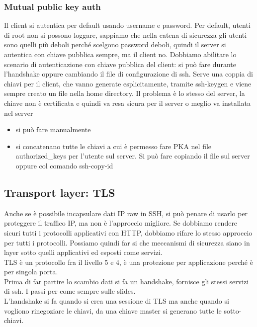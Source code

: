 \documentclass[12pt, oneside]{extbook} %
\begin{document}
\subsubsection{Mutual public key auth}
Il client si autentica per default usando username e password. Per default, utenti di root non si possono loggare, sappiamo che nella catena di sicurezza gli utenti sono quelli più deboli perché scelgono password deboli, quindi il server si autentica con chiave pubblica sempre, ma il client no. Dobbiamo abilitare lo scenario di autenticazione con chiave pubblica del client: si può fare durante l'handshake oppure cambiando il file di configurazione di ssh. Serve una coppia di chiavi per il client, che vanno generate esplicitamente, tramite \textsf{ssh-keygen} e viene sempre creato un file nella home directory. Il problema è lo stesso del server, la chiave non è certificata e quindi va resa sicura per il server o meglio va installata nel server
\begin{itemize}
\item si può fare manualmente
\item si concatenano tutte le chiavi a cui è permesso fare PKA nel file \textsf{authorized\_keys} per l'utente sul server. Si può fare copiando il file sul server oppure col comando \textsf{ssh-copy-id}
\end{itemize}
\subsection{Transport layer: TLS}
Anche se è possibile incapsulare dati IP raw in SSH, si può penare di usarlo per proteggere il traffico IP, ma non è l'approccio migliore. Se dobbiamo rendere sicuri tutti i protocolli applicativi con HTTP, dobbiamo rifare lo stesso approccio per tutti i protocolli. Possiamo quindi far si che meccanismi di sicurezza siano in layer sotto quelli applicativi ed esposti come servizi.\\ TLS è un protocollo fra il livello 5 e 4, è una protezione per applicazione perché è per singola porta.\\ Prima di far partire lo scambio dati si fa un handshake, fornisce gli stessi servizi di ssh. I passi per come sempre sulle slides.\\ L'handshake si fa quando si crea una sessione di TLS ma anche quando si vogliono rinegoziare le chiavi, da una chiave master si generano tutte le sotto-chiavi.
\end{document}
